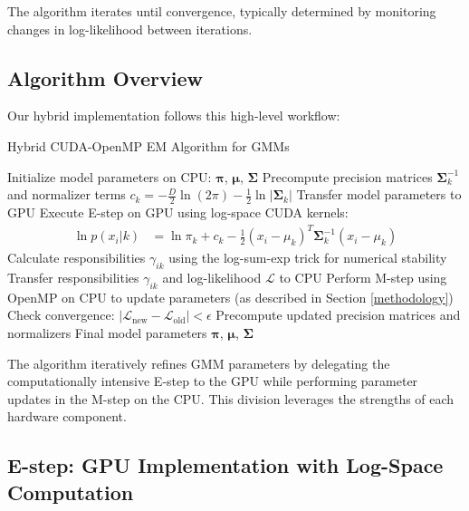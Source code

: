 \documentclass[conference]{IEEEtran}
\begin{document}
The algorithm iterates until convergence, typically determined by monitoring changes in log-likelihood between iterations.

\subsection{Algorithm Overview}

Our hybrid implementation follows this high-level workflow:

\begin{algorithm}[h]
\caption{Hybrid CUDA-OpenMP EM Algorithm for GMMs}
\begin{algorithmic}[1]
\STATE Initialize model parameters on CPU: $\boldsymbol{\pi}$, $\boldsymbol{\mu}$, $\boldsymbol{\Sigma}$
\STATE Precompute precision matrices $\boldsymbol{\Sigma}^{-1}_k$ and normalizer terms $c_k = -\frac{D}{2}\ln(2\pi) - \frac{1}{2}\ln|\boldsymbol{\Sigma}_k|$
    \STATE Transfer model parameters to GPU
    \STATE Execute E-step on GPU using log-space CUDA kernels:
    \begin{align}
        \ln p(x_i | k) &= \ln\pi_k + c_k - \frac{1}{2}(x_i-\mu_k)^T \boldsymbol{\Sigma}_k^{-1} (x_i-\mu_k)
    \end{align}
    \STATE Calculate responsibilities $\gamma_{ik}$ using the log-sum-exp trick for numerical stability
    \STATE Transfer responsibilities $\gamma_{ik}$ and log-likelihood $\mathcal{L}$ to CPU
    \STATE Perform M-step using OpenMP on CPU to update parameters (as described in Section \ref{methodology})
    \STATE Check convergence: $|\mathcal{L}_{\text{new}} - \mathcal{L}_{\text{old}}| < \epsilon$
        \STATE Precompute updated precision matrices and normalizers
    \ENDIF
\ENDWHILE
\RETURN Final model parameters $\boldsymbol{\pi}$, $\boldsymbol{\mu}$, $\boldsymbol{\Sigma}$
\end{algorithmic}
\end{algorithm}

The algorithm iteratively refines GMM parameters by delegating the computationally intensive E-step to the GPU while performing parameter updates in the M-step on the CPU. This division leverages the strengths of each hardware component.

\subsection{E-step: GPU Implementation with Log-Space Computation}
\end{document}
